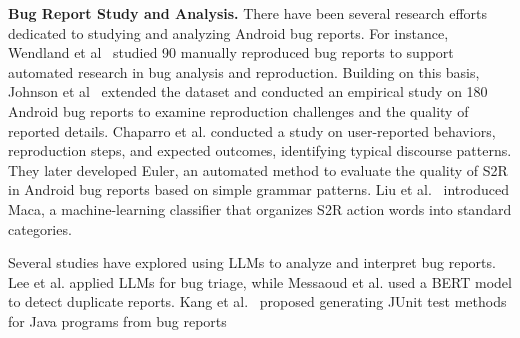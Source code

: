 %

\noindent\textbf{Bug Report Study and Analysis.}
There have been several research efforts dedicated to studying and analyzing Android bug reports.
For instance, Wendland et al~\cite{wendland2021andror2} studied 90 manually reproduced bug reports to support automated research in bug analysis and reproduction. Building on this basis, Johnson et al~\cite{johnson2022empirical} extended the dataset and conducted an empirical study on 180 Android bug reports to examine reproduction challenges and the quality of reported details.
%
Chaparro et al.\cite{chaparroDetectingMissingInformation2017} conducted a study on user-reported behaviors, reproduction steps, and expected outcomes, identifying typical discourse patterns. They later developed Euler\cite{chaparroAssessingQualitySteps2019}, an automated method to evaluate the quality of S2R in Android bug reports based on simple grammar patterns. Liu et al.~\cite{liuAutomatedClassificationActions2020} introduced Maca, a machine-learning classifier that organizes S2R action words into standard categories.

Several studies have explored using LLMs to analyze and interpret bug reports. Lee et al.\cite{lee2022light} applied LLMs for bug triage, while Messaoud et al.\cite{messaoud2022duplicate} used a BERT model to detect duplicate reports. Kang et al.~\cite{kang2023large} proposed generating JUnit test methods for Java programs from bug reports


